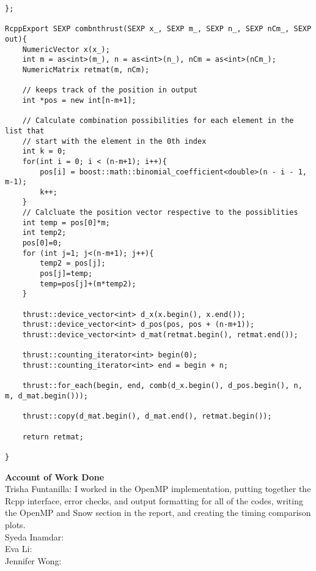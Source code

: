 {\begin{lstlisting}
};

RcppExport SEXP combnthrust(SEXP x_, SEXP m_, SEXP n_, SEXP nCm_, SEXP out){
	NumericVector x(x_);
	int m = as<int>(m_), n = as<int>(n_), nCm = as<int>(nCm_);
	NumericMatrix retmat(m, nCm);

    // keeps track of the position in output
    int *pos = new int[n-m+1];
    
    // Calculate combination possibilities for each element in the list that
    // start with the element in the 0th index
    int k = 0;
    for(int i = 0; i < (n-m+1); i++){
        pos[i] = boost::math::binomial_coefficient<double>(n - i - 1, m-1);
        k++;
    }
    // Calcluate the position vector respective to the possiblities
    int temp = pos[0]*m;
    int temp2;
    pos[0]=0;
    for (int j=1; j<(n-m+1); j++){
        temp2 = pos[j];
        pos[j]=temp;
        temp=pos[j]+(m*temp2);
    }
	
	thrust::device_vector<int> d_x(x.begin(), x.end());
    thrust::device_vector<int> d_pos(pos, pos + (n-m+1));
	thrust::device_vector<int> d_mat(retmat.begin(), retmat.end());
    
	thrust::counting_iterator<int> begin(0);
	thrust::counting_iterator<int> end = begin + n;

	thrust::for_each(begin, end, comb(d_x.begin(), d_pos.begin(), n, m, d_mat.begin()));

	thrust::copy(d_mat.begin(), d_mat.end(), retmat.begin());
	
	return retmat;
    
}

\end{lstlisting}
}



\null
\textbf{\LARGE{Account of Work Done}}\\
\null
Trisha Funtanilla: I worked in the OpenMP implementation, putting together the Rcpp interface, error checks, and output formatting for all of the codes, writing the OpenMP and Snow section in the report, and creating the timing comparison plots.
\\
\null
Syeda Inamdar:
\\
\null
Eva Li: 
\\
\null
Jennifer Wong:



